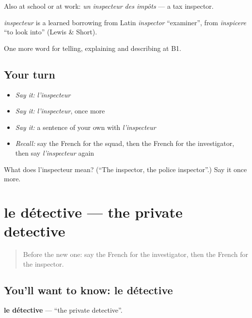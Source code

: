 Also at school or at work: \emph{un inspecteur des impôts} — a tax inspector.

\begin{cousinweb}
\emph{inspecteur} is a learned borrowing from Latin \emph{īnspector} \textquotedblleft{}examiner\textquotedblright{}, from \emph{īnspicere} \textquotedblleft{}to look into\textquotedblright{} (Lewis \& Short).
\end{cousinweb}

\begin{grammarlens}[title={What you've built}]
One more word for telling, explaining and describing at B1.
\end{grammarlens}

\subsection*{Your turn}
\begin{itemize}
\raggedright
  \item \emph{Say it:} \emph{l'inspecteur}
  \item \emph{Say it:} \emph{l'inspecteur}, once more
  \item \emph{Say it:} a sentence of your own with \emph{l'inspecteur}
  \item \emph{Recall:} say the French for the squad, then the French for the investigator, then say \emph{l'inspecteur} again
\end{itemize}

\begin{tcolorbox}[breakable,colback=teal!4,colframe=teal!35!black,title={Before you move on}]
What does l'inspecteur mean? (\textquotedblleft{}The inspector, the police inspector\textquotedblright{}.) Say it once more.
\end{tcolorbox}
\section[le détective]{le détective — the private detective}

\label{lesson:FR-C292-detective}



\begin{quote}
Before the new one: say the French for the investigator, then the French for the inspector.
\end{quote}

\subsection*{You'll want to know: le détective}
\textbf{le détective} — \textquotedblleft{}the private detective\textquotedblright{}.

